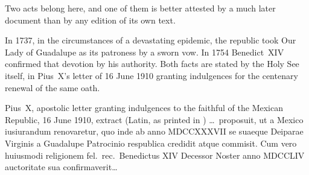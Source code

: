 Two acts belong here, and one of them is better attested by a much
later document than by any edition of its own text.

In 1737, in the circumstances of a devastating epidemic, the republic
took Our Lady of Guadalupe as its patroness by a sworn vow. In 1754
Benedict~XIV confirmed that devotion by his authority. Both facts are
stated by the Holy See itself, in Pius~X's letter of 16 June 1910
granting indulgences for the centenary renewal of the same oath.

\begin{operativetext}{Pius~X, apostolic letter granting indulgences to
the faithful of the Mexican Republic, 16 June 1910, extract (Latin, as
printed in )}
\ldots\ proposuit, ut a Mexico iusiurandum renovaretur, quo inde ab
anno MDCCXXXVII se suaeque Deiparae Virginis a Guadalupe Patrocinio
respublica credidit atque commisit. Cum vero huiusmodi religionem
fel.\ rec.\ Benedictus XIV Decessor Noster anno MDCCLIV auctoritate
sua confirmaverit\ldots{}
\end{operativetext}

